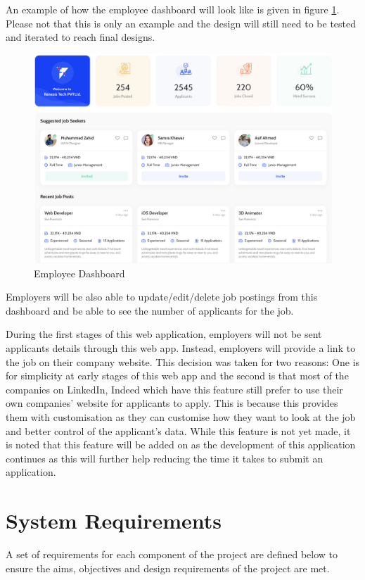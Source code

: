 An example of how the employee dashboard will look like is given in figure \ref{fig:Employee Dashboard}. Please not that this is only an example and the design will still need to be tested and iterated to reach final designs. \parencite{Reference40}

\begin{figure}
    \centering
    \includegraphics[width=140mm]{Figures/employer-dashboard.png}
    \caption{Employee Dashboard}
    \label{fig:Employee Dashboard}
\end{figure}

Employers will be also able to update/edit/delete job postings from this dashboard and be able to see the number of applicants for the job. 

During the first stages of this web application, employers will not be sent applicants details through this web app. Instead, employers will provide a link to the job on their company website. This decision was taken for two reasons: One is for simplicity at early stages of this web app and the second is that most of the companies on LinkedIn, Indeed which have this feature still prefer to use their own companies' website for applicants to apply. This is because this provides them with customisation as they can customise how they want to look at the job and better control of the applicant's data. While this feature is not yet made, it is noted that this feature will be added on as the development of this application continues as this will further help reducing the time it takes to submit an application.


\section{System Requirements}
A set of requirements for each component of the project are defined below to ensure the aims, objectives and design requirements of the project are met.

